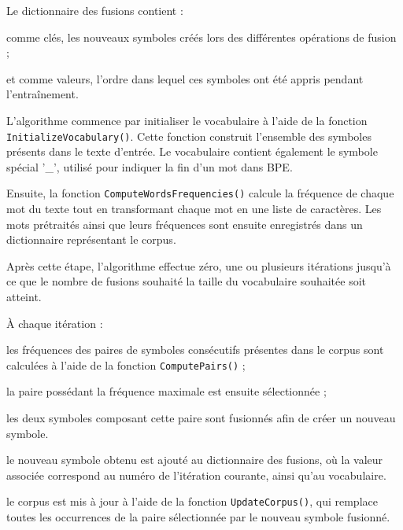 \documentclass[12pt,a4paper]{report}
\begin{document}
Le dictionnaire des fusions contient :

\begin{itemizeFB}
	\item comme clés, les nouveaux symboles créés lors des différentes opérations de fusion ;
	\item et comme valeurs, l’ordre dans lequel ces symboles ont été appris pendant l’entraînement.
\end{itemizeFB}

L’algorithme commence par initialiser le vocabulaire à l’aide de la fonction \texttt{InitializeVocabulary()}. Cette fonction construit l’ensemble des symboles présents dans le texte d’entrée. Le vocabulaire contient également le symbole spécial '\_', utilisé pour indiquer la fin d’un mot dans BPE.

Ensuite, la fonction \texttt{ComputeWordsFrequencies()} calcule la fréquence de chaque mot du texte tout en transformant chaque mot en une liste de caractères. Les mots prétraités ainsi que leurs fréquences sont ensuite enregistrés dans un dictionnaire représentant le corpus.

Après cette étape, l’algorithme effectue zéro, une ou plusieurs itérations jusqu’à ce que le nombre de fusions souhaité la taille du vocabulaire souhaitée soit atteint.

À chaque itération :

\begin{itemizeFB}
    \item les fréquences des paires de symboles consécutifs présentes dans le corpus sont calculées à l’aide de la fonction \texttt{ComputePairs()} ;
	\item la paire possédant la fréquence maximale est ensuite sélectionnée ;
	\item les deux symboles composant cette paire sont fusionnés afin de créer un nouveau symbole.
	\item le nouveau symbole obtenu est ajouté au dictionnaire des fusions, où la valeur associée correspond au numéro de l’itération courante, ainsi qu’au vocabulaire.
	\item le corpus est mis à jour à l’aide de la fonction \texttt{UpdateCorpus()}, qui remplace toutes les occurrences de la paire sélectionnée par le nouveau symbole fusionné.
\end{itemizeFB}
\end{document}
